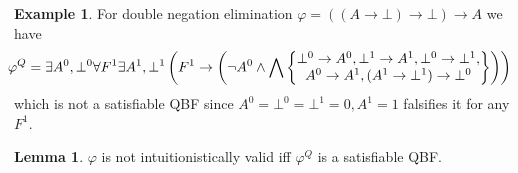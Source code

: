 \documentclass[a4paper,12pt]{report}
\theoremstyle{definition}
\theoremstyle{definition}
\theoremstyle{definition}
\newtheorem{lemma}[theorem]{Lemma}
\theoremstyle{definition}
\theoremstyle{definition}
\theoremstyle{definition}
\newtheorem{example}[theorem]{Example}
\theoremstyle{definition}
\begin{document}
	\begin{example}
		For double negation elimination $\varphi = ((A\to \bot)\to \bot)\to A$ we have
		$$\hspace*{-.3cm}
			\varphi^Q = \exists A^0,\bot^0\forall F^1\exists A^1,\bot^1\left(F^1\to\left(\neg A^0\wedge\bigwedge\left\{\begin{matrix}
				\bot^0\to A^0,\bot^1\to A^1,\bot^0\to \bot^1,\\
				 A^0\to A^1, (A^1\to \bot^1)\to \bot^0 
			\end{matrix}\right\}\right)\right)
		$$
		which is not a satisfiable QBF since $A^0 = \bot^0 = \bot^1 = 0, A^1 = 1$ falsifies it for any $F^1$.
	\end{example}


	\begin{lemma}
		$\varphi$ is not intuitionistically valid iff $\varphi^Q$ is a satisfiable QBF.
	\end{lemma}
\end{document}

